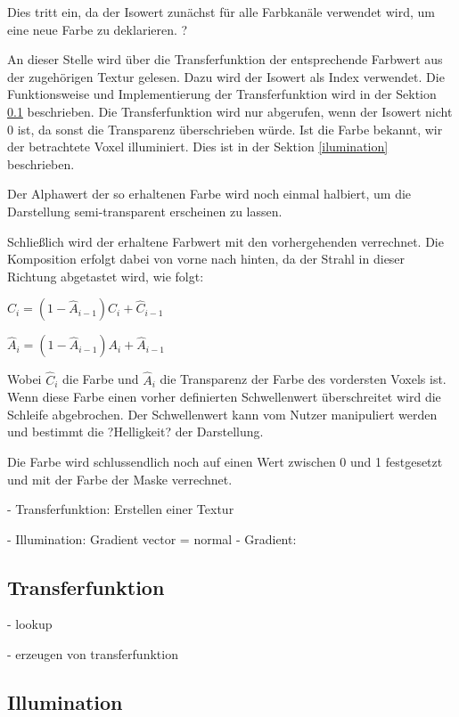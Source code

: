 Dies tritt ein, da der Isowert zunächst für alle Farbkanäle verwendet wird, um eine neue Farbe zu deklarieren. ?

An dieser Stelle wird über die Transferfunktion der entsprechende Farbwert aus der zugehörigen Textur gelesen. Dazu wird der Isowert als Index verwendet. Die Funktionsweise und Implementierung der Transferfunktion wird in der Sektion \ref{transfer} beschrieben.
Die Transferfunktion wird nur abgerufen, wenn der Isowert nicht 0 ist, da sonst die Transparenz überschrieben würde.
Ist die Farbe bekannt, wir der betrachtete Voxel illuminiert. Dies ist in der Sektion \ref{ilumination} beschrieben. 

Der Alphawert der so erhaltenen Farbe wird noch einmal halbiert, um die Darstellung semi-transparent erscheinen zu lassen.

Schließlich wird der erhaltene Farbwert mit den vorhergehenden verrechnet. Die Komposition erfolgt dabei von vorne nach hinten, da der Strahl in dieser Richtung abgetastet wird, wie folgt:

$\hat{C}_{i}=(1-\hat{A}_{i-1})C_{i}+\hat{C}_{i-1}$

$\hat{A}_{i}=(1-\hat{A}_{i-1})A_{i}+\hat{A}_{i-1}$

Wobei $\hat{C}_{i}$ die Farbe und $\hat{A}_{i}$ die Transparenz der Farbe des vordersten Voxels ist.
Wenn diese Farbe einen vorher definierten Schwellenwert überschreitet wird die Schleife abgebrochen. Der Schwellenwert kann vom Nutzer manipuliert werden und bestimmt die ?Helligkeit? der Darstellung.

Die Farbe wird schlussendlich noch auf einen Wert zwischen 0 und 1 festgesetzt und mit der Farbe der Maske verrechnet.



- Transferfunktion: Erstellen einer Textur

- Illumination: Gradient vector = normal
- Gradient: 



\subsection{Transferfunktion}
\label{transfer}

- lookup

- erzeugen von transferfunktion

\subsection{Illumination}
\label{illumination}

